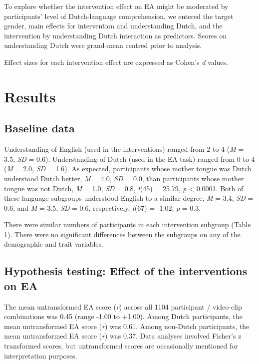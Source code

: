 \documentclass[authordate, empirical]{jote-new-article}
\begin{document}
	To explore whether the intervention effect on EA might be moderated by participants' level of Dutch-language comprehension, we entered the target gender, main effects for intervention and understanding Dutch, and the intervention by understanding Dutch interaction as predictors. Scores on understanding Dutch were grand-mean centred prior to analysis.



	Effect sizes for each intervention effect are expressed as Cohen's \emph{d} values.



	\section{Results}



	\subsection{Baseline data}



	Understanding of English (used in the interventions) ranged from 2 to 4 (\emph{M} = 3.5, \emph{SD} = 0.6). Understanding of Dutch (used in the EA task) ranged from 0 to 4 (\emph{M} = 2.0, \emph{SD} = 1.6). As expected, participants whose mother tongue was Dutch understood Dutch better, \emph{M} = 4.0, \emph{SD} = 0.0, than participants whose mother tongue was not Dutch, \emph{M} = 1.0, \emph{SD} = 0.8, \emph{t}(45) = 25.79, \emph{p} < 0.0001. Both of these language subgroups understood English to a similar degree, \emph{M} = 3.4, \emph{SD} = 0.6, and \emph{M} = 3.5, \emph{SD} = 0.6, respectively, \emph{t}(67) = -1.02, \emph{p} = 0.3.



	There were similar numbers of participants in each intervention subgroup (Table 1). There were no significant differences between the subgroups on any of the demographic and trait variables.



	\subsection{Hypothesis testing: Effect of the interventions on EA}



	The mean untransformed EA score (\emph{r}) across all 1104 participant / video-clip combinations was 0.45 (range -1.00 to +1.00). Among Dutch participants, the mean untransformed EA score (\emph{r}) was 0.61. Among non-Dutch participants, the mean untransformed EA score (\emph{r}) was 0.37. Data analyses involved Fisher's z transformed scores, but untransformed scores are occasionally mentioned for interpretation purposes.
\end{document}
